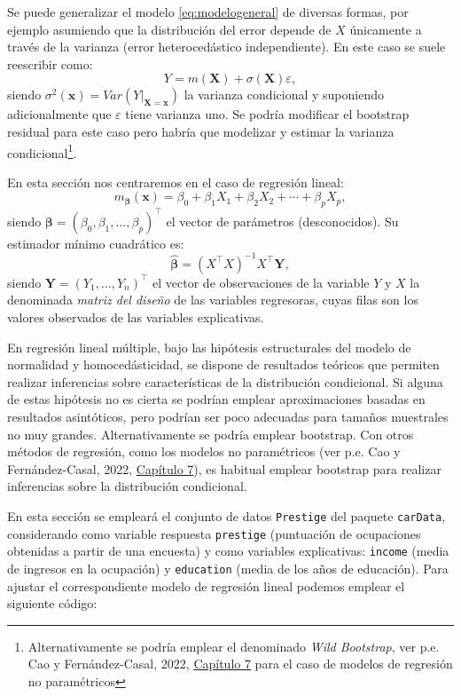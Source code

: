 \documentclass[
  spanish,
  10pt,
]{book}
\renewcommand{\boldsymbol}[1]{\symbf{#1}}
\renewcommand{\mathbf}[1]{\symbf{#1}}
\theoremstyle{break}
\theoremstyle{nonumberplain}
\let\oldfootnote\footnote
\renewcommand\footnote[1]{\oldfootnote{\hspace{2mm}#1}}
\begin{document}
Se puede generalizar el modelo \eqref{eq:modelogeneral} de diversas formas, por ejemplo asumiendo que la distribución del error depende de \(X\) únicamente a través de la varianza (error heterocedástico independiente).
En este caso se suele reescribir como:
\[Y = m(\mathbf{X}) + \sigma(\mathbf{X}) \varepsilon,\]
siendo \(\sigma^2(\mathbf{x}) = Var\left( \left. Y\right\vert_{\mathbf{X}=\mathbf{x}} \right)\) la varianza condicional y suponiendo adicionalmente que \(\varepsilon\) tiene varianza uno.
Se podría modificar el bootstrap residual para este caso pero habría que modelizar y estimar la varianza condicional\footnote{Alternativamente se podría emplear el denominado \emph{Wild Bootstrap}, ver p.e. Cao y Fernández-Casal, 2022, \href{https://rubenfcasal.github.io/book_remuestreo/m\%C3\%A9todos-de-remuestreo-en-regresi\%C3\%B3n-no-param\%C3\%A9trica.html\#wild-bootstrap}{Capítulo 7} para el caso de modelos de regresión no paramétricos}.

En esta sección nos centraremos en el caso de regresión lineal:
\[m_{\boldsymbol{\beta}}(\mathbf{x}) =  \beta_{0} + \beta_{1}X_{1} + \beta_{2}X_{2} + \cdots + \beta_{p}X_{p},\]
siendo \(\boldsymbol{\beta} = \left(  \beta_{0}, \beta_{1}, \ldots, \beta_{p} \right)^{\top}\) el vector de parámetros (desconocidos).
Su estimador mínimo cuadrático es:
\[\boldsymbol{\hat{\beta}} = \left( X^{\top}X\right)^{-1}X^{\top}\mathbf{Y},\]
siendo \(\mathbf{Y} = \left( Y_{1}, \ldots, Y_{n} \right)^{\top}\) el vector de observaciones de la variable \(Y\) y \(X\) la denominada \emph{matriz del diseño} de las variables regresoras, cuyas filas son los valores observados de las variables explicativas.

En regresión lineal múltiple, bajo las hipótesis estructurales del modelo de normalidad y homocedásticidad, se dispone de resultados teóricos que permiten realizar inferencias sobre características de la distribución condicional. Si alguna de estas hipótesis no es cierta se podrían emplear aproximaciones basadas en resultados asintóticos, pero podrían ser poco adecuadas para tamaños muestrales no muy grandes. Alternativamente se podría emplear bootstrap.
Con otros métodos de regresión, como los modelos no paramétricos (ver p.e. Cao y Fernández-Casal, 2022, \href{https://rubenfcasal.github.io/book_remuestreo/m\%C3\%A9todos-de-remuestreo-en-regresi\%C3\%B3n-no-param\%C3\%A9trica.html}{Capítulo 7}), es habitual emplear bootstrap para realizar inferencias sobre la distribución condicional.

En esta sección se empleará el conjunto de datos \texttt{Prestige} del paquete \texttt{carData}, considerando como variable respuesta \texttt{prestige} (puntuación de ocupaciones obtenidas a partir de una encuesta) y como variables explicativas: \texttt{income} (media de ingresos en la ocupación) y \texttt{education} (media de los años de educación).
Para ajustar el correspondiente modelo de regresión lineal podemos emplear el siguiente código:
\end{document}
